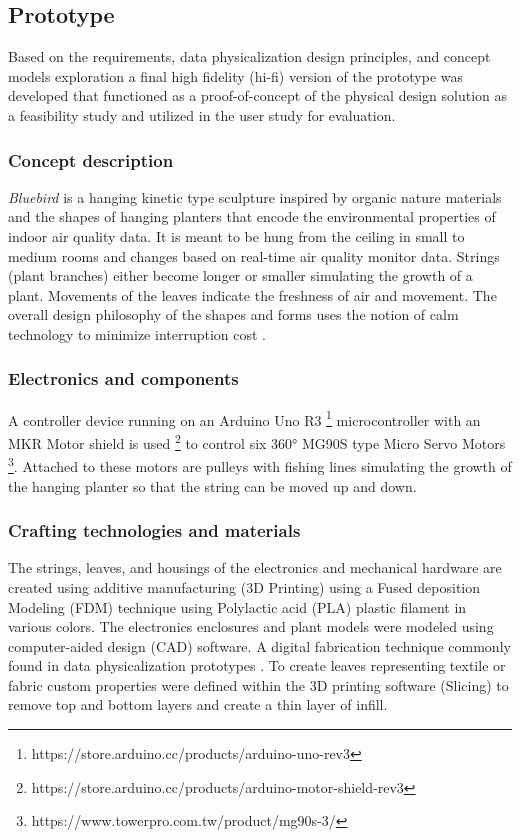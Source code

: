 \subsection{Prototype}
\label{sec:prototype}

Based on the requirements, data physicalization design principles, and concept models exploration a final high fidelity (hi-fi) version of the prototype was developed that functioned as a proof-of-concept of the physical design solution as a feasibility study and utilized in the user study for evaluation.

\subsubsection{Concept description}

\textit{Bluebird} is a hanging kinetic type sculpture inspired by organic nature materials and the shapes of hanging planters that encode the environmental properties of indoor air quality data. It is meant to be hung from the ceiling in small to medium rooms and changes based on real-time air quality monitor data. Strings (plant branches) either become longer or smaller simulating the growth of a plant. Movements of the leaves indicate the freshness of air and movement. The overall design philosophy of the shapes and forms uses the notion of calm technology to minimize interruption cost \cite{case_calm_2016}. 

\subsubsection{Electronics and components}

A controller device running on an Arduino Uno R3 \footnote{https://store.arduino.cc/products/arduino-uno-rev3} microcontroller with an MKR Motor shield is used \footnote{https://store.arduino.cc/products/arduino-motor-shield-rev3} to control six 360° MG90S type Micro Servo Motors \footnote{https://www.towerpro.com.tw/product/mg90s-3/}. Attached to these motors are pulleys with fishing lines simulating the growth of the hanging planter so that the string can be moved up and down.


\subsubsection{Crafting technologies and materials}
The strings, leaves, and housings of the electronics and mechanical hardware are created using additive manufacturing (3D Printing) using a Fused deposition Modeling (FDM) technique using Polylactic acid (PLA) plastic filament in various colors. The electronics enclosures and plant models were modeled using computer-aided design (CAD) software. A digital fabrication technique commonly found in data physicalization prototypes \cite{anhalt_university_germany_design_2022}. To create leaves representing textile or fabric custom properties were defined within the 3D printing software (Slicing) to remove top and bottom layers and create a thin layer of infill.

